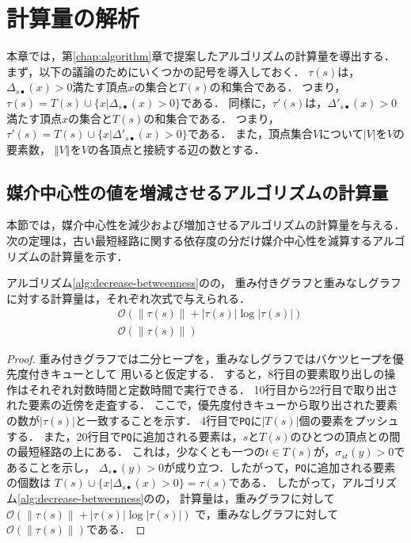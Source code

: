 \chapter{計算量の解析}
\label{chap:complexity-analysis}

本章では，第\ref{chap:algorithm}章で提案したアルゴリズムの計算量を導出する．
まず，以下の議論のためにいくつかの記号を導入しておく．
$\tau(s)$は，$\Delta_{s\bullet}(x)>0$満たす頂点$x$の集合と$T(s)$の和集合である．
つまり，$\tau(s)=T(s)\cup\{x|\Delta_{s\bullet}(x)>0\}$である．
同様に，$\tau'(s)$は，$\Delta'_{s\bullet}(x)>0$満たす頂点$x$の集合と$T(s)$の和集合である．
つまり，$\tau'(s)=T(s)\cup\{x|\Delta'_{s\bullet}(x)>0\}$である．
また，頂点集合$V$について$\left\vert V\right\vert$を$V$の要素数，
$\left\Vert V\right\Vert$を$V$の各頂点と接続する辺の数とする．

\section{媒介中心性の値を増減させるアルゴリズムの計算量}

本節では，媒介中心性を減少および増加させるアルゴリズムの計算量を与える．
次の定理は，古い最短経路に関する依存度の分だけ媒介中心性を減算するアルゴリズムの計算量を示す．

\begin{theorem}
  \label{thm:decrease-betweenness-weight-complexity}
  アルゴリズム\ref{alg:decrease-betweenness}のの，
  重み付きグラフと重みなしグラフに対する計算量は，それぞれ次式で与えられる．
  \begin{align}
    &\mathcal{O}\left(\left\|\tau(s)\right\|+\left|\tau(s)\right|\log\left|\tau(s)\right|\right)
    \label{eq:decrease-betweenness-weighted-complexity} \\
    &\mathcal{O}\left(\left\|\tau(s)\right\|\right)
    \label{eq:decrease-betweenness-unweighted-complexity}
  \end{align}
\end{theorem}
\begin{proof}
  重み付きグラフでは二分ヒープを，重みなしグラフではバケツヒープを優先度付きキューとして
  用いると仮定する．
  すると，8行目の要素取り出しの操作はそれぞれ対数時間と定数時間で実行できる．
  10行目から22行目で取り出された要素の近傍を走査する．
  ここで，優先度付きキューから取り出された要素の数が$|\tau(s)|$と一致することを示す．
  4行目で\texttt{PQ}に$|T(s)|$個の要素をプッシュする．
  また，20行目で\texttt{PQ}に追加される要素は，$s$と$T(s)$のひとつの頂点との間の最短経路の上にある．
  これは，少なくとも一つの$t\in T(s)$が，$\sigma_{st}(y)>0$であることを示し，
  $\Delta_{s\bullet}(y)>0$が成り立つ．したがって，\texttt{PQ}に追加される要素の個数は
  $T(s)\cup\{x|\Delta_{s\bullet}(x)>0\}=\tau(s)$である．
  したがって，アルゴリズム\ref{alg:decrease-betweenness}のの，
  計算量は，重みグラフに対して$\mathcal{O}(\|\tau(s)\|+|\tau(s)|\log|\tau(s)|)$
  で，重みなしグラフに対して$\mathcal{O}(\|\tau(s)\|)$である．
\end{proof}

